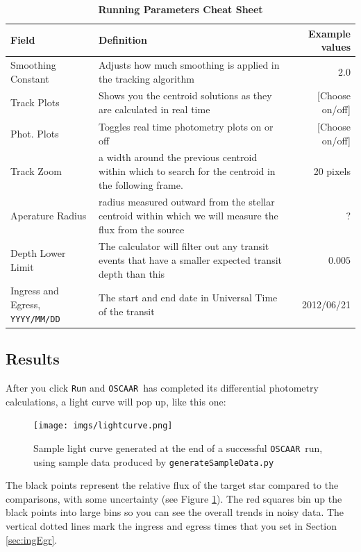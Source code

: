 \documentclass[a4paper]{article}
\newcommand{\code}[1]{\texttt{#1}}
\newcommand{\oscaar}{\code{OSCAAR}~}
\begin{document}
\pagebreak
\begin{table}[H]
\renewcommand{\arraystretch}{1.5}
\centering
\caption{\textbf{Running Parameters Cheat Sheet}}
\begin{tabular}{p{0.8in} |  p{3.2in} r}
Field & Definition & Example values\\
\hline\hline
Smoothing Constant & Adjusts how much smoothing is applied in the tracking algorithm & 2.0\\
Track Plots & Shows you the centroid solutions as they are calculated in real time & [Choose on/off]\\
Phot. Plots & Toggles real time photometry plots on or off & [Choose on/off]\\
Track Zoom & a width around the previous centroid within which to search for the centroid in the following frame. &  20 pixels\\
Aperature Radius & radius measured outward from the stellar centroid within which we will measure the flux from the source & ?\\
Depth Lower Limit & The calculator will filter out any transit events that have a smaller expected transit depth than this& $0.005$\\
Ingress and Egress, \code{YYYY/MM/DD} & The start and end date in Universal Time of the transit & 2012/06/21\\
\hline 
\end{tabular}
\end{table}

\subsection{Results}
After you click \code{Run} and \oscaar has completed its differential photometry calculations, a light curve will pop up, like this one:
\begin{figure}[H]
\begin{center}
\texttt{[image: imgs/lightcurve.png]}
\caption{Sample light curve generated at the end of a successful \oscaar run, using sample data produced by \code{generateSampleData.py}}
\label{fig:lightcurve}
\end{center}	
\end{figure}
The black points represent the relative flux of the target star compared to the comparisons, with some uncertainty (see Figure \ref{fig:lightcurve}). The red squares bin up the black points into large bins so you can see the overall trends in noisy data. The vertical dotted lines mark the ingress and egress times that you set in Section \ref{sec:ingEgr}. 
\end{document}
